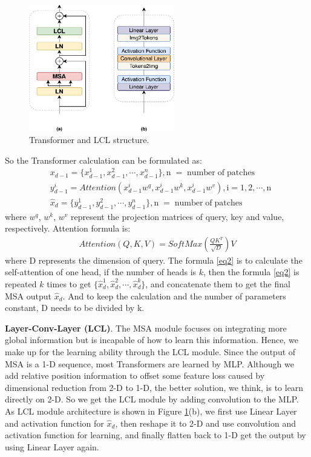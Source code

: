 \documentclass[lettersize,journal]{IEEEtran}
\begin{document}
\begin{figure}[!t]
	\centering
	\includegraphics[width=2.5in]{3.eps}
	\caption{Transformer and LCL structure.}
	\label{fig3}
\end{figure}
So the Transformer calculation can be formulated as:
\begin{equation}
\begin{aligned}
\label{eq2}
&x_{d-1} = \{x^1_{d-1}, x^2_{d-1}, \cdots, x^n_{d-1}\},  \mathrm{n\;=\;number\;of\;patches}\\
&y^i_{d-1} = Attention(x^i_{d-1}w^q, x^i_{d-1}w^k, x^i_{d-1}w^v), \mathrm{i=1, 2, \cdots, n} \\
&\hat{x}_{d} = \{y^1_{d-1}, y^2_{d-1}, \cdots, y^n_{d-1}\}, \mathrm{n\;=\;number\;of\;patches}
\end{aligned}
\end{equation}
where $w^q$, $w^k$, $w^v$ represent the projection matrices of query, key and value, respectively. Attention formula is:
\begin{equation}
\label{eq3}
\begin{aligned}
Attention(Q, K, V) = SoftMax(\frac{QK^T}{\sqrt{D}})V
\end{aligned}\end{equation}
where D represents the dimension of query. The formula \eqref{eq2} is to calculate the self-attention of one head, if the number of heads is $k$, then the formula \eqref{eq2} is repeated $k$ times to get $\{\hat{x}^1_{d},\hat{x}^2_{d},\cdots,\hat{x}^k_{d}\}$, and concatenate them to get the final MSA output $\hat{x}_{d}$. And to keep the calculation and the number of parameters constant, D needs to be divided by k.

\textbf{Layer-Conv-Layer (LCL)}. The MSA module focuses on integrating more global information but is incapable of how to learn this information. Hence, we make up for the learning ability through the LCL module. Since the output of MSA is a 1-D sequence, most Transformers are learned by MLP. Although we add relative position information to offset some feature loss caused by dimensional reduction from 2-D to 1-D, the better solution, we think, is to learn directly on 2-D. So we get the LCL module by adding convolution to the MLP. As LCL module architecture is shown in Figure \ref{fig3}(b), we first use Linear Layer and activation function for $\hat{x}_d$, then reshape it to 2-D and use convolution and activation function for learning, and finally flatten back to 1-D get the output by using Linear Layer again.
\end{document}
